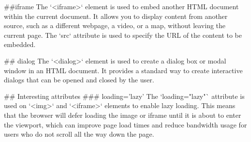 ##iframe
The `<iframe>` element is used to embed another HTML document within the current document. 
It allows you to display content from another source, such as a different webpage, a video, or a map, without leaving the current page. The `src` attribute is used to specify the URL of the content to be embedded.

## dialog
The `<dialog>` element is used to create a dialog box or modal window in an HTML document.
It provides a standard way to create interactive dialogs that can be opened and closed by the user.

## Interesting attributes
### loading='lazy'
The `loading="lazy"` attribute is used on `<img>` and `<iframe>` elements to enable lazy loading. 
This means that the browser will defer loading the image or iframe until it is about to enter the viewport, which can improve page load times and reduce bandwidth usage for users who do not scroll all the way down the page.